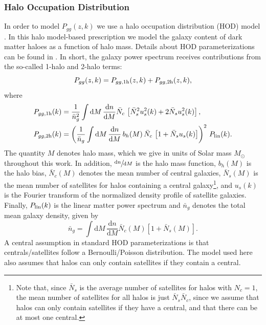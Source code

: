 \documentclass[a4paper,11pt]{article}
\begin{document}
  \subsubsection{Halo Occupation Distribution}\label{sssec:methods.theory.hod}
    In order to model $P_{gg}(z,k)$ we use a halo occupation distribution (HOD) model \citep{2000MNRAS.318.1144P,2002PhR...372....1C,2002ApJ...575..587B,2005ApJ...633..791Z,2013MNRAS.430..725V}. In this halo model-based prescription we model the galaxy content of dark matter haloes as a function of halo mass. Details about HOD parameterizations can be found in \cite{2011ApJ...736...59Z}. In short, the galaxy power spectrum receives contributions from the so-called 1-halo and 2-halo terms:
    \begin{equation}
      P_{gg}(z,k) = P_{gg,{\rm 1h}}(z,k) + P_{gg,{\rm 2h}}(z,k),
    \end{equation}
    where
    \begin{align}
      & P_{gg,{\rm 1h}}(k)=\frac{1}{\bar{n}_g^2} \int \mathrm{d}M\,\frac{\mathrm{d}n}{\mathrm{d}M} \bar{N}_c\,\left[\bar{N}_s^2u_s^2(k)+2\bar{N}_su_s^2(k)\right],\\
      & P_{gg,{\rm 2h}}(k)=\left(\frac{1}{\bar{n}_g} \int \mathrm{d}M\,\frac{\mathrm{d}n}{\mathrm{d}M}\,b_h(M)\,\bar{N}_c\,\left[1+\bar{N}_su_s(k)\right]\right)^2\,P_{\rm lin}(k).
    \end{align}
    The quantity $M$ denotes halo mass, which we give in units of Solar mass $M_{\odot}$ throughout this work. In addition, $\sfrac{\mathrm{d}n}{\mathrm{d}M}$ is the halo mass function, $b_h(M)$ is the halo bias, $\bar{N}_c(M)$ denotes the mean number of central galaxies, $\bar{N}_s(M)$ is the mean number of satellites for halos containing a central galaxy\footnote{Note that, since $\bar{N}_s$ is the average number of satellites for halos with $N_c=1$, the mean number of satellites for all halos is just $\bar{N}_s\bar{N}_c$, since we assume that halos can only contain satellites if they have a central, and that there can be at most one central.}, and $u_s(k)$ is the Fourier transform of the normalized density profile of satellite galaxies. Finally, $P_{\rm lin}(k)$ is the linear matter power spectrum and $\bar{n}_g$ denotes the total mean galaxy density, given by
    \begin{equation}
      \bar{n}_g=\int \mathrm{d}M\,\frac{\mathrm{d}n}{\mathrm{d}M}\bar{N}_c(M)\left[1+\bar{N}_s(M)\right].
      \label{eq:ng_hod}
    \end{equation}
    A central assumption in standard HOD parameterizations is that centrals/satellites follow a Bernoulli/Poisson distribution. The model used here also assumes that halos can only contain satellites if they contain a central.
\end{document}
